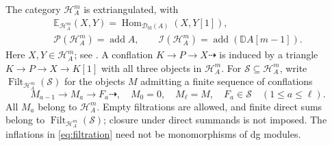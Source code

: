 \documentclass[11pt,a4paper]{article}
\newcommand{\D}{\mathcal D}
\renewcommand{\H}{\mathcal H}
\newcommand{\dual}{\mathbb D}
\DeclareMathOperator{\fd}{fd}
\DeclareMathOperator{\Hom}{Hom}
\DeclareMathOperator{\add}{add}
\DeclareMathOperator{\Filt}{Filt}
\theoremstyle{plain}
\theoremstyle{definition}
\numberwithin{equation}{section}
\begin{document}
The category $\H_A^m$ is extriangulated, with
\begin{equation}\label{eq:extriangulated}
 \begin{gathered}
 \mathbb E_{\H_A^m}(X,Y)=\Hom_{\D_{\fd}(A)}(X,Y[1]),\\
 \mathcal P(\H_A^m)=\add A,\qquad
 \mathcal I(\H_A^m)=\add(\dual A[m-1]).
 \end{gathered}
\end{equation}
Here $X,Y\in\H_A^m$; see \cite[Corollary 2.3]{MP25}.
A conflation $K\to P\to X\dashrightarrow$ is induced by a triangle
$K\to P\to X\to K[1]$ with all three objects in $\H_A^m$.
For $\mathcal S\subseteq\H_A^m$, write $\Filt_{\H_A^m}(\mathcal S)$
for the objects $M$ admitting a finite sequence of conflations
\begin{equation}\label{eq:filtration}
 M_{a-1}\longrightarrow M_a\longrightarrow F_a\dashrightarrow,
 \quad M_0=0,\quad M_\ell=M,\quad F_a\in\mathcal S
 \quad(1\leq a\leq\ell).
\end{equation}
All $M_a$ belong to $\H_A^m$. Empty filtrations are allowed, and finite
direct sums belong to $\Filt_{\H_A^m}(\mathcal S)$; closure under direct
summands is not imposed. The inflations in \eqref{eq:filtration} need
not be monomorphisms of dg modules.
\end{document}
